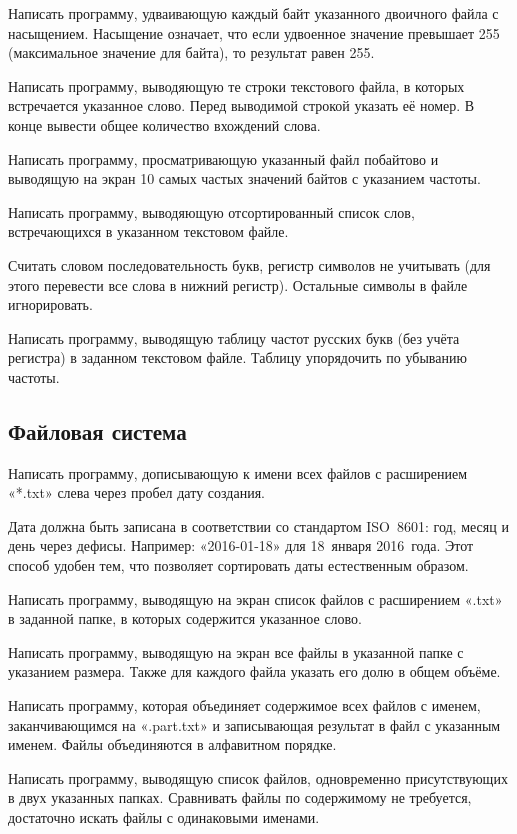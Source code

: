 \task Написать программу, удваивающую каждый байт указанного двоичного
файла с насыщением. Насыщение означает, что если удвоенное значение
превышает 255 (максимальное значение для байта), то результат равен
255.

\task Написать программу, выводяющую те строки текстового файла, в
которых встречается указанное слово. Перед выводимой строкой указать
её номер. В конце вывести общее количество вхождений слова.

\task Написать программу, просматривающую указанный файл побайтово и
выводящую на экран 10 самых частых значений байтов с указанием
частоты.

\task Написать программу, выводяющую отсортированный список слов,
встречающихся в указанном текстовом файле.

Считать словом последовательность букв, регистр символов не учитывать
(для этого перевести все слова в нижний регистр). Остальные символы в
файле игнорировать.

\task Написать программу, выводящую таблицу частот русских букв (без
учёта регистра) в заданном текстовом файле. Таблицу упорядочить по
убыванию частоты.


\subsection{Файловая система}

\task Написать программу, дописывающую к имени всех файлов с
расширением «*.txt» слева через пробел дату создания.

Дата должна быть записана в соответствии со стандартом ISO~8601: год,
месяц и день через дефисы. Например: «2016-01-18» для 18~января
2016~года. Этот способ удобен тем, что позволяет сортировать даты
естественным образом.

\task Написать программу, выводящую на экран список файлов с
расширением «.txt» в заданной папке, в которых содержится указанное
слово.

\task Написать программу, выводящую на экран все файлы в указанной
папке с указанием размера. Также для каждого файла указать его долю в
общем объёме.

\task Написать программу, которая объединяет содержимое всех файлов с
именем, заканчивающимся на «.part.txt» и записывающая результат в файл
с указанным именем. Файлы объединяются в алфавитном порядке.

\task Написать программу, выводящую список файлов, одновременно
присутствующих в двух указанных папках. Сравнивать файлы по
содержимому не требуется, достаточно искать файлы с одинаковыми
именами.

